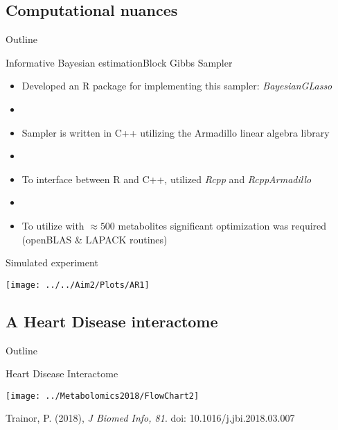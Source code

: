 \documentclass[xcolor=dvipsnames]{beamer}
\begin{document}
\subsection{Computational nuances}

\begin{frame}{Outline}
\vspace{-10.5pt}
\end{frame}

\begin{frame}{Informative Bayesian estimation}{Block Gibbs Sampler}
	\vspace{-15.5pt}
	\begin{itemize}
		\item Developed an R package for implementing this sampler: \emph{BayesianGLasso} \pause
		\item[]
		\item Sampler is written in C++ utilizing the Armadillo linear algebra library \pause
		\item[]
		\item To interface between R and C++, utilized \emph{Rcpp} and \emph{RcppArmadillo} \pause
		\item[]
		\item To utilize with $\approx 500$ metabolites significant optimization was required (openBLAS \& LAPACK routines)
	\end{itemize}
\end{frame}

\begin{frame}{Simulated experiment}
	\begin{center}
		\texttt{[image: ../../Aim2/Plots/AR1]}
	\end{center}
\end{frame}

\subsection{A Heart Disease interactome}

\begin{frame}{Outline}
\vspace{-10.5pt}
\end{frame}

\begin{frame}{Heart Disease Interactome}
		\begin{center}
		\texttt{[image: ../Metabolomics2018/FlowChart2]}
		
		Trainor, P. (2018), \emph{J Biomed Info, 81}. doi: 10.1016/j.jbi.2018.03.007
	\end{center}
\end{frame}
\end{document}
